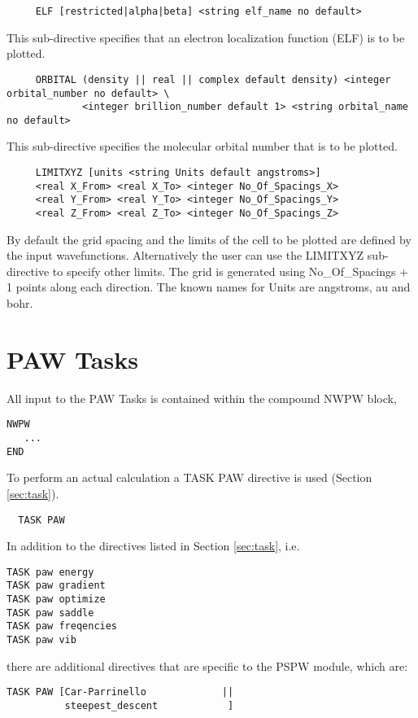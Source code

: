 \begin{verbatim}
     ELF [restricted|alpha|beta] <string elf_name no default>
\end{verbatim}
This sub-directive specifies that an electron localization function (ELF) is to be plotted.

\begin{verbatim}
     ORBITAL (density || real || complex default density) <integer orbital_number no default> \
             <integer brillion_number default 1> <string orbital_name no default>
\end{verbatim}
This sub-directive specifies the molecular orbital number that is to be plotted.

\begin{verbatim}
     LIMITXYZ [units <string Units default angstroms>]
     <real X_From> <real X_To> <integer No_Of_Spacings_X>
     <real Y_From> <real Y_To> <integer No_Of_Spacings_Y>
     <real Z_From> <real Z_To> <integer No_Of_Spacings_Z>
\end{verbatim}
By default the grid spacing and the limits of the cell to be plotted are defined by the input wavefunctions.  Alternatively the user can use the LIMITXYZ sub-directive to specify other limits.  The grid is generated using No\_Of\_Spacings + 1 points along each direction. The known names for Units are angstroms, au and bohr.




\section{PAW Tasks}
\label{sec:paw_tasks}


All input to the PAW Tasks is contained within the compound NWPW block,
\begin{verbatim}
NWPW
   ...
END
\end{verbatim}


To perform an actual calculation a TASK PAW directive is used
(Section \ref{sec:task}).  
\begin{verbatim}
  TASK PAW
\end{verbatim} 
In addition to the directives listed in Section \ref{sec:task}, i.e.
\begin{verbatim}
TASK paw energy          
TASK paw gradient         
TASK paw optimize         
TASK paw saddle           
TASK paw freqencies       
TASK paw vib
\end{verbatim}
there are additional directives that are specific to the PSPW module, which are:
\begin{verbatim}
TASK PAW [Car-Parrinello             ||
          steepest_descent            ]
\end{verbatim}



